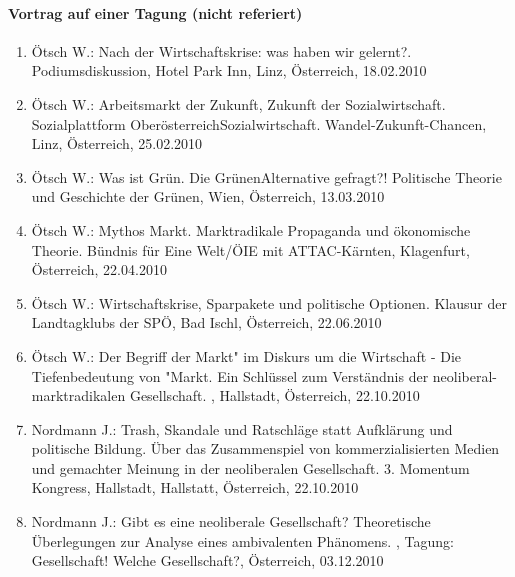 \paragraph{Vortrag auf einer Tagung (nicht referiert)}
\begin{enumerate}
	\item Ötsch W.: Nach der Wirtschaftskrise: was haben wir gelernt?. Podiumsdiskussion, Hotel Park Inn, Linz, Österreich, 18.02.2010
	\item Ötsch W.: Arbeitsmarkt der Zukunft, Zukunft der Sozialwirtschaft. Sozialplattform OberösterreichSozialwirtschaft. Wandel-Zukunft-Chancen, Linz, Österreich, 25.02.2010
	\item Ötsch W.: Was ist Grün. Die GrünenAlternative gefragt?! Politische Theorie und Geschichte der Grünen, Wien, Österreich, 13.03.2010
	\item Ötsch W.: Mythos Markt. Marktradikale Propaganda und ökonomische Theorie. Bündnis für Eine Welt/ÖIE mit ATTAC-Kärnten, Klagenfurt, Österreich, 22.04.2010
	\item Ötsch W.: Wirtschaftskrise, Sparpakete und politische Optionen. Klausur der Landtagklubs der SPÖ, Bad Ischl, Österreich, 22.06.2010
	\item Ötsch W.: Der Begriff \glqq der Markt" im Diskurs um die Wirtschaft - Die Tiefenbedeutung von "Markt\grqq{}. Ein Schlüssel zum Verständnis der neoliberal-marktradikalen Gesellschaft. , Hallstadt, Österreich, 22.10.2010
	\item Nordmann J.: Trash, Skandale und Ratschläge statt Aufklärung und politische Bildung. Über das Zusammenspiel von kommerzialisierten Medien und gemachter Meinung in der neoliberalen Gesellschaft. 3. Momentum Kongress, Hallstadt, Hallstatt, Österreich, 22.10.2010
	\item Nordmann J.: Gibt es eine neoliberale Gesellschaft? Theoretische Überlegungen zur Analyse eines ambivalenten Phänomens. , Tagung: Gesellschaft! Welche Gesellschaft?, Österreich, 03.12.2010
\end{enumerate}
